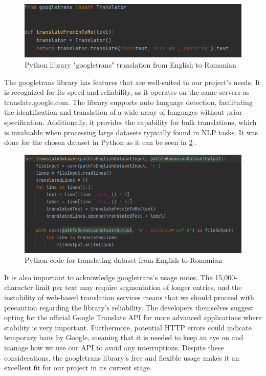 \begin{figure}[htbp]
	\centering
		\includegraphics[scale=1]{LaTeX Bachelor Thesis Depression Signs Detection/figures/codeGoogleTransUsage.png}
	\caption{Python library "googletrans" translation from English to Romanian}
	\label{codeGoogleTransUsage}
\end{figure}

The googletrans library \cite{googletranslib} has features that are well-suited to our project's needs. It is recognized for its speed and reliability, as it operates on the same servers as translate.google.com. The library supports auto language detection, facilitating the identification and translation of a wide array of languages without prior specification. Additionally, it provides the capability for bulk translations, which is invaluable when processing large datasets typically found in NLP tasks. It was done for the chosen dataset \cite{depressionDataset} in Python as it can be seen in \ref{codeDatasetTranslation} .

\begin{figure}[htbp]
	\centering
		\includegraphics[scale=1]{LaTeX Bachelor Thesis Depression Signs Detection/figures/codeDatasetTranslation.png}
	\caption{Python code for translating dataset from English to Romanian}
	\label{codeDatasetTranslation}
\end{figure}

It is also important to acknowledge googletrans's \cite{googletranslib} usage notes. The 15,000-character limit per text may require segmentation of longer entries, and the instability of web-based translation services means that we should proceed with precaution regarding the library's reliability. The developers themselves suggest opting for the official Google Translate API for more advanced applications where stability is very important. Furthermore, potential HTTP errors could indicate temporary bans by Google, meaning that it is needed to keep an eye on and manage how we use our API to avoid any interruptions. Despite these considerations, the googletrans library's free and flexible usage makes it an excellent fit for our project in its current stage.


